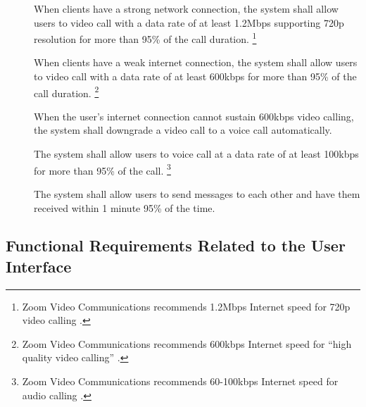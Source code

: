 \begin{description}
    \item[\textbf{\showfunccallcounter}]
        When clients have a strong network connection, the system shall allow
            users to video call with a data rate of at least 1.2Mbps supporting
            720p resolution for more than 95\% of the call duration.
        \footnote{Zoom Video Communications recommends 1.2Mbps Internet speed
            for 720p video calling \cite{zoom_system_requirements}.}
    \item[\textbf{\showfunccallcounter}]
        When clients have a weak internet connection, the system shall allow
            users to video call with a data rate of at least 600kbps for more
            than 95\% of the call duration.
        \footnote{Zoom Video Communications recommends 600kbps Internet speed
            for ``high quality video calling'' \cite{zoom_system_requirements}.}
    \item[\textbf{\showfunccallcounter}]
        When the user's internet connection cannot sustain 600kbps video
            calling, the system shall downgrade a video call to a voice call
            automatically.
    \item[\textbf{\showfunccallcounter}]
        The system shall allow users to voice call at a data rate of at least
            100kbps for more than 95\% of the call.
        \footnote{Zoom Video Communications recommends 60-100kbps Internet speed
            for audio calling \cite{zoom_system_requirements}.}
    \item[\textbf{\showfunccallcounter}]
        The system shall allow users to send messages to each other and have
            them received within 1 minute 95\% of the time.
\end{description}

\subsection*{Functional Requirements Related to the User Interface}


